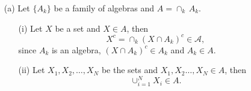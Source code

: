 \documentclass[a4paper,11pt]{article}
\begin{document}
	\begin{enumerate}
		\item [(a)]
			Let $\{A_k\}$ be a family of algebras and $A = \cap_k\,A_k$.
			\begin{enumerate}
				\item [(i)] 
					Let $X$ be a set and $X \in A$, then
						$$X^c
						= \cap_k(X \cap A_k)^c
						\in \mathscr{A},$$
					since $A_k$ is an algebra, $(X \cap A_k)^c \in A_k$ and $A_k \in A$.\

				\item [(ii)]
					Let $X_1, X_2, \dots, X_N$ be the sets and $X_1, X_2 \dots, X_N \in A$, then
						$$\cup_{i=1}^N X_i \in A.$$
			\end{enumerate}


\end{enumerate}
\end{document}
